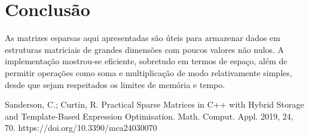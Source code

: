 \documentclass[12pt]{article}
\begin{document}
\section{Conclusão}

As matrizes esparsas aqui apresentadas são úteis para armazenar dados em estruturas matriciais de grandes dimensões com poucos valores não nulos. A implementação mostrou-se eficiente, sobretudo em termos de espaço, além de permitir operações como soma e multiplicação de modo relativamente simples, desde que sejam respeitados os limites de memória e tempo.




Sanderson, C.; Curtin, R. Practical Sparse Matrices in C++ with Hybrid Storage and Template-Based Expression Optimisation. Math. Comput. Appl. 2019, 24, 70. https://doi.org/10.3390/mca24030070
\end{document}
